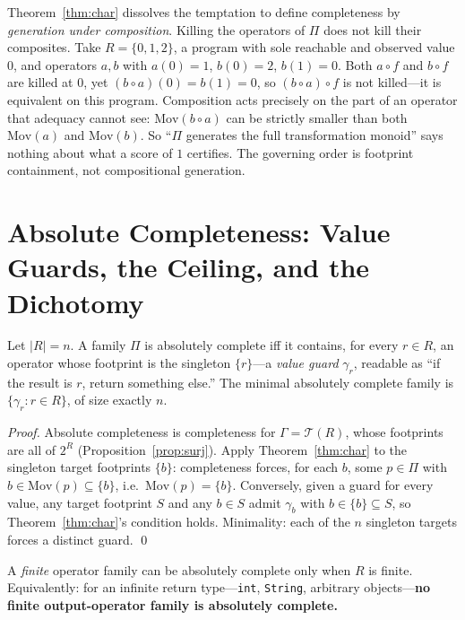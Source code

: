 \documentclass[runningheads,envcountsect,envcountsame]{llncs}
\newcommand{\Mov}{\mathrm{Mov}}
\newcommand{\TR}{\mathcal{T}(R)}
\begin{document}
\begin{remark}
\label{rem:composition}
Theorem~\ref{thm:char} dissolves the temptation to define completeness by
\emph{generation under composition}. Killing the operators of $\Pi$ does not kill
their composites. Take $R = \{0,1,2\}$, a program with sole reachable and
observed value $0$, and operators $a,b$ with $a(0) = 1$, $b(0) = 2$, $b(1) = 0$.
Both $a \circ f$ and $b \circ f$ are killed at $0$, yet $(b \circ a)(0) = b(1) =
0$, so $(b \circ a) \circ f$ is not killed---it is equivalent on this program.
Composition acts precisely on the part of an operator that adequacy cannot see:
$\Mov(b \circ a)$ can be strictly smaller than both $\Mov(a)$ and $\Mov(b)$. So
``$\Pi$ generates the full transformation monoid'' says nothing about what a
score of $1$ certifies. The governing order is footprint containment, not
compositional generation.
\end{remark}

\section{Absolute Completeness: Value Guards, the Ceiling, and the Dichotomy}
\label{sec:absolute}

\begin{corollary}
\label{cor:guards}
Let $|R| = n$. A family $\Pi$ is absolutely complete iff it contains, for every
$r \in R$, an operator whose footprint is the singleton $\{r\}$---a \emph{value
guard} $\gamma_r$, readable as ``if the result is $r$, return something else.''
The minimal absolutely complete family is $\{\gamma_r : r \in R\}$, of size
exactly $n$.
\end{corollary}

\begin{proof}
Absolute completeness is completeness for $\Gamma = \TR$, whose footprints are
all of $2^R$ (Proposition~\ref{prop:surj}). Apply Theorem~\ref{thm:char} to the
singleton target footprints $\{b\}$: completeness forces, for each $b$, some
$p \in \Pi$ with $b \in \Mov(p) \subseteq \{b\}$, i.e.\ $\Mov(p) = \{b\}$.
Conversely, given a guard for every value, any target footprint $S$ and any
$b \in S$ admit $\gamma_b$ with $b \in \{b\} \subseteq S$, so
Theorem~\ref{thm:char}'s condition holds. Minimality: each of the $n$ singleton
targets forces a distinct guard. \qed
\end{proof}

\begin{corollary}
\label{cor:infinite}
A \emph{finite} operator family can be absolutely complete only when $R$ is
finite. Equivalently: for an infinite return type---\texttt{int},
\texttt{String}, arbitrary objects---\textbf{no finite output-operator family is
absolutely complete.}
\end{corollary}
\end{document}
